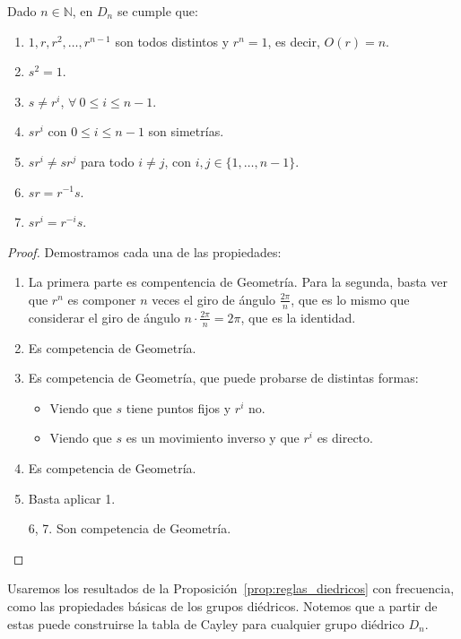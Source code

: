 \begin{prop}\label{prop:reglas_diedricos}
    Dado $n\in \mathbb{N}$, en $D_n$ se cumple que:
    \begin{enumerate}
        \item $1,r,r^2,\ldots,r^{n-1}$ son todos distintos y $r^n =1$, es decir, $O(r)=n$.
        \item $s^2 = 1$.
        \item $s\neq r^i$, $\forall\ 0 \leq i \leq n-1$.
        \item $sr^i$ con $0\leq i\leq n-1$ son simetrías. 
        \item $sr^i \neq sr^j$ para todo $i\neq j$, con $i,j \in \{1,\ldots,n-1\}$.
        \item $sr = r^{-1}s$.
        \item $sr^i = r^{-i}s$.
    \end{enumerate}
    \begin{proof}
        Demostramos cada una de las propiedades:
        \begin{enumerate}
            \item La primera parte es compentencia de Geometría. Para la segunda, basta ver que $r^n$ es componer $n$ veces el giro de ángulo $\frac{2\pi}{n}$, que es lo mismo que considerar el giro de ángulo $n\cdot \frac{2\pi}{n} = 2\pi$, que es la identidad.
            \item Es competencia de Geometría.
            \item Es competencia de Geometría, que puede probarse de distintas formas:
                \begin{itemize}
                    \item Viendo que $s$ tiene puntos fijos y $r^i$ no.
                    \item Viendo que $s$ es un movimiento inverso y que $r^i$ es directo.
                \end{itemize}
            \item Es competencia de Geometría.
            \item Basta aplicar 1.
            \item[6, 7.] Son competencia de Geometría.
        \end{enumerate}
    \end{proof}
\end{prop}

Usaremos los resultados de la Proposición~\ref{prop:reglas_diedricos} con frecuencia, como las propiedades básicas de los grupos diédricos. Notemos que a partir de estas puede construirse la tabla de Cayley para cualquier grupo diédrico $D_n$.

